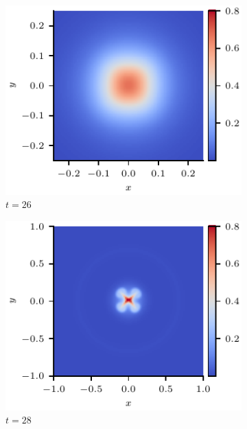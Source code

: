 \documentclass[12pt]{article}
\begin{document}
\begin{figure}[t]
  \centering
    \begin{subfigure}{0.32\textwidth}
      \includegraphics[width=\linewidth]{swi-4_pressure_13.pdf}
      \caption{$t=26$}
      \label{fig:swi-4_pressure_13}
    \end{subfigure}
    \hfill
    \begin{subfigure}{0.32\textwidth}
      \includegraphics[width=\linewidth]{swi-4_pressure_14.pdf}
      \caption{$t=28$}
      \label{fig:swi-4_pressure_14}
    \end{subfigure}
    \hfill
    \begin{subfigure}{0.32\textwidth}

\end{subfigure}
\end{figure}
\end{document}

